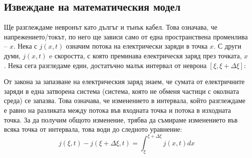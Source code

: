 \documentclass{article}
\begin{document}
\subsection{Извеждане на математическия модел}
    Ще разглеждаме невронът като дългъг и тънък кабел. Това означава, че напрежението/токът, по него ще зависи само от една пространствена
    променлива -- $x$. Нека с $j\left(x, t\right)$ означим потока на електрически заряди в точка $x$. С други думи, $j\left(x, t\right)$ e
    скоростта, с която преминава електрическя заряд през точката, $x$. Нека сега разгледаме един, достатъчно малък интервал от неврона
    $\left[\xi, \xi+\Delta\xi\right]$:

    \begin{figure}[h!]
        \centering
        
        \caption{}
    \end{figure}

    От закона за запазване на електрическия заряд знаем, че сумата от електричните заряди в една затворена система (система, която не обменя
    частици с околната среда) се запазва. Това означава, че изменението в интервала, който разглеждаме е равно на разликата между потока във
    входната точка и потока в изходната точка. За да получим общото изменение, трябва да съмираме изменението във всяка точка от интервала,
    това води до следното уравнение:
    \begin{equation}
        j\left(\xi,t\right) - j\left(\xi + \Delta\xi, t\right) = \int_{\xi}^{\xi + \Delta\xi} j\left(x, t\right) dx
    \end{equation}
\end{document}
